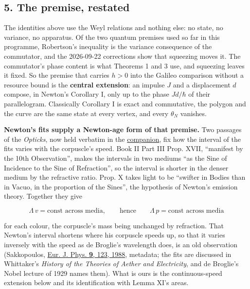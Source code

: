 \documentclass[11pt,a4paper]{article}
\begin{document}
\hypertarget{the-premise-restated}{%
\subsection{5. The premise, restated}\label{the-premise-restated}}

The identities above use the Weyl relations and nothing else: no state,
no variance, no apparatus. Of the two quantum premises used so far in
this programme, Robertson's inequality is the variance consequence of
the commutator, and the 2026-09-22 corrections show that squeezing moves
it. The commutator's phase content is what Theorems 1 and 3 use, and
squeezing leaves it fixed. So the premise that carries \(h>0\) into the
Galileo comparison without a resource bound is the \textbf{central
extension}: an impulse \(J\) and a displacement \(d\) compose, in
Newton's Corollary I, only up to the phase \(Jd/\hbar\) of their
parallelogram. Classically Corollary I is exact and commutative, the
polygon and the curve are the same state at every vertex, and every
\(\theta_N\) vanishes.

\textbf{Newton's fits supply a Newton-age form of that premise.} Two
passages of the \emph{Opticks}, now held verbatim in the
\href{../docs/classics/Newton_Opticks_1730_fits_and_queries.md}{companion},
fix how the interval of the fits varies with the corpuscle's speed. Book
II Part III Prop. XVII, ``manifest by the 10th Observation'', makes the
intervals in two mediums ``as the Sine of Incidence to the Sine of
Refraction'', so the interval is shorter in the denser medium by the
refractive ratio. Prop. X takes light to be ``swifter in Bodies than in
Vacuo, in the proportion of the Sines'', the hypothesis of Newton's
emission theory. Together they give

\[\Lambda\,v=\text{const across media},\qquad\text{hence}\qquad
\Lambda\,p=\text{const across media}\]

for each colour, the corpuscle's mass being unchanged by refraction.
That Newton's interval shortens where his corpuscle speeds up, so that
it varies inversely with the speed as de Broglie's wavelength does, is
an old observation (Sakkopoulos,
\href{https://doi.org/10.1088/0143-0807/9/2/007}{Eur. J. Phys.
\textbf{9}, 123, 1988}, metadata; the fits are discussed in Whittaker's
\emph{History of the Theories of Aether and Electricity}, and de
Broglie's Nobel lecture of 1929 names them). What is ours is the
continuous-speed extension below and its identification with Lemma XI's
areas.
\end{document}
